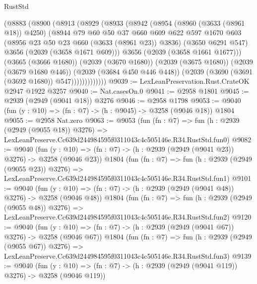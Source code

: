 \begin{lexlean}{RustStd}
\begin{coremodule}
              (@8883
                (@8900
                  (@8913
                    (@8929
                      (@8933
                        (@8942
                          (@8954
                            (@8960 (@3633 (@8961 @18)) @4250)
                            (@8944
                              @79
                              @60
                              @50
                              @37
                              @660
                              @609
                              @622
                              @597
                              @1670
                              @603
                              (@8956 @23 @50 @23 @660 (@3633 (@8961 @23)) @3836)
                              (@3650 @6291 @547)
                              @3656
                              (@2039 (@3658 @1671 @609)))
                            @3656
                            (@2039 (@3658 @1661 @1677)))
                          (@3665 (@3666 @1680))
                          (@2039 (@3670 @1680))
                          (@2039 (@3675 @1680))
                          (@2039 (@3679 @1680 @446))
                          (@2039 (@3684 @450 @446 @448))
                          (@2039 (@3690 (@3691 (@3692 @1680)) @547)))))))))))))
@9039 := LexLeanPreservation.Rust.CrateOK @2947 @1922 @3257
@9040 := Nat.casesOn.{0}
@9041 := @2958 @1801
@9045 := @2939 (@2949 (@9041 @18)) @3276
@9046 := @2958 @1798
@9053 := @9040 (fun (y : @10) => (fn : @7) -> (h : @9045) -> @3258 (@9046 @18)) @1804
@9055 := @2958 Nat.zero
@9063 := @9053
    (fun (fn : @7) =>
    fun (h : @2939 (@2949 (@9055 @18)) @3276) =>
    LexLeanPreserve.Cc639d244984595f0311043c4c505146e.R34.RustStd.fun0)
@9082 := @9040
    (fun (y : @10) => (fn : @7) -> (h : @2939 (@2949 (@9041 @23)) @3276) -> @3258 (@9046 @23))
    @1804
    (fun (fn : @7) =>
    fun (h : @2939 (@2949 (@9055 @23)) @3276) =>
    LexLeanPreserve.Cc639d244984595f0311043c4c505146e.R34.RustStd.fun1)
@9101 := @9040
    (fun (y : @10) => (fn : @7) -> (h : @2939 (@2949 (@9041 @48)) @3276) -> @3258 (@9046 @48))
    @1804
    (fun (fn : @7) =>
    fun (h : @2939 (@2949 (@9055 @48)) @3276) =>
    LexLeanPreserve.Cc639d244984595f0311043c4c505146e.R34.RustStd.fun2)
@9120 := @9040
    (fun (y : @10) => (fn : @7) -> (h : @2939 (@2949 (@9041 @67)) @3276) -> @3258 (@9046 @67))
    @1804
    (fun (fn : @7) =>
    fun (h : @2939 (@2949 (@9055 @67)) @3276) =>
    LexLeanPreserve.Cc639d244984595f0311043c4c505146e.R34.RustStd.fun3)
@9139 := @9040
    (fun (y : @10) => (fn : @7) -> (h : @2939 (@2949 (@9041 @119)) @3276) -> @3258 (@9046 @119))

\end{coremodule}
\end{lexlean}
